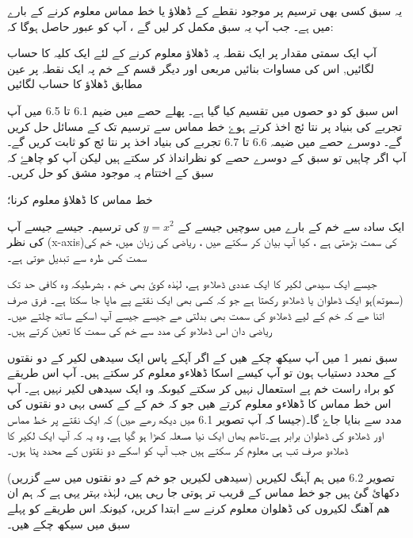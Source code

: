 \[ \]







یہ سبق کسی بھی  ترسیم پر موجود نقطے کے ڈھلاؤ یا خط مماس معلوم کرنے کے بارے میں ہے۔  جب آپ یہ سبق مکمل کر لیں گے ، آپ کو عبور حاصل ہوگا کہ:
 
 
آپ ایک سمتی مقدار پر ایک نقطہ پہ  ڈھلاؤ معلوم کرنے کے لئے ایک کلیہ کا حساب لگائیں, اس کی مساوات بنائیں
 مربعی اور دیگر قسم کے خم پہ ایک نقطہ پر عین مطابق ڈھلاؤ کا حساب لگائیں 
 

اس سبق کو دو حصوں میں تقسیم کیا گیا ہے۔ پھلے حصے میں ضیم 6.1 تا 6.5 میں آپ تجربے کی بنیاد پر نتا ئج اخذ کرتے ہوۓ خط مماس سے ترسیم تک کے مسائل حل کریں گے۔ دوسرے حصے میں ضیمہ 6.6 تا 6.7   تجربے کی بنیاد اخذ پر نتا ئج کو  ثابت کریں گے۔
آپ اگر چاہیں تو سبق کے دوسرے حصے کو نظرانداذ کر سکتے ہیں لیکن آپ کو چاھۓ کہ سبق کے اختتام پہ موجود مشق کو حل کریں۔




خط مماس کا ڈھلاؤ معلوم کرنا؛

ایک سادہ سے خم کے بارے میں سوچیں جیسے کے  \( y=x^{2}\) کی ترسیم۔ جیسے جیسے  آپ کی نظر (x-axis)کی سمت بڑھتی ہے ، کیا آپ بیان کر سکتے ھیں ، ریاضی کی زبان میں، خم کی سمت کس طرہ سے تبدیل ھوتی ہے۔

جیسے ایک سیدھی لکیر کا ایک عددی ڈھلاءو ہے، لہٰذہ کوئ بھی خم ، بشرطیکہ وہ کافی حد تک (سموتھ)ہو ایک ڈھلوان یا ڈھلاءو رکھتا ہے جو کہ کسی بھی ایک نقتے پے ماپا جا سکتا ہے۔ فرق صرف اتنا ھے کہ خم کے لیے ڈھلاءو کی سمت بھی بدلتی ھے جیسے جیسے آپ اسکے ساتھ چلتے ھیں۔ ریاضی دان اس ڈھلاءو کی مدد سے خم کی سمت کا تعین کرتے ہیں۔


سبق نمبر 1 میں آپ سیکھ چکے ھیں کے اگر آپکے پاس ایک سیدھی لکیر کے دو نقتوں کے محدد دستیاب ہون تو آپ کیسے اسکا ڈھلاءو معلوم کر سکتے ہیں۔ آپ اس طریقے کو براہ راست خم پے استعمال نہیں کر سکتے کیوںکہ وہ ایک سیدھی لکیر نہیں ہے۔ آپ اس خط مماس کا ڈھلاءو معلوم کرتے ھیں جو کہ خم کے کے کسی بہی دو نقتوں کی مدد سے بنایا جاۓ گا۔(جیسا کہ آپ تصویر 6.1 میں دیکھ رھے ھیں) کہ ایک نقتے پر خط مماس اور ڈھلاءو کی ڈھلوان برابر ہے۔تاھم یھاں ایک نیا مسعلہ کھڑا ہو گیا ہے، وہ یہ کہ آپ ایک لکیر کا ڈھلاءو صرف تب ہی معلوم کر سکتے ہیں جب آپ کو اسکے دو نقتوں کے محدد  پتا ہوں۔

تصویر 6.2 میں ہم آہنگ لکیریں (سیدھی لکیریں جو خم کے دو نقتوں میں سے گزریں) دکھائ گئ ہیں جو خط مماس کے قریب تر ہوتی جا رہی ہیں، لہٰذہ بہتر یہی ہے کہ ہم ان ھم آھنگ لکیروں کی ڈھلوان معلوم کرنے سے ابتدا کریں، کیونکہ اس طریقے کو پہلے سبق میں سیکھ چکے ھیں۔




